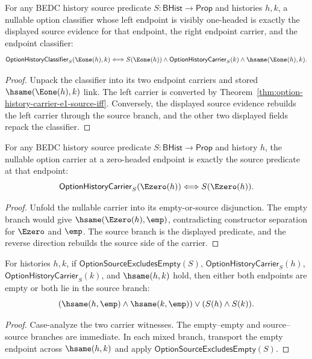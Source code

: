 \begin{theorem}
\label{thm:option-history-classifier-e1-left-source-iff}
For any BEDC history source predicate $S:\mathsf{BHist}\to\mathsf{Prop}$ and
histories $h,k$, a nullable option classifier whose left endpoint is visibly
one-headed is exactly the displayed source evidence for that endpoint, the
right endpoint carrier, and the endpoint classifier:
$$
\mathsf{OptionHistoryClassifier}_S(\Eone(h),k)
\Longleftrightarrow
S(\Eone(h))\land \mathsf{OptionHistoryCarrier}_S(k)\land
\hsame(\Eone(h),k).
$$
\end{theorem}
\begin{proof}
Unpack the classifier into its two endpoint carriers and stored
$\hsame(\Eone(h),k)$ link. The left carrier is converted by
Theorem~\ref{thm:option-history-carrier-e1-source-iff}. Conversely, the
displayed source evidence rebuilds the left carrier through the source branch,
and the other two displayed fields repack the classifier.
\end{proof}

\begin{theorem}
\label{thm:option-history-carrier-e0-source-iff}
For any BEDC history source predicate $S:\mathsf{BHist}\to\mathsf{Prop}$ and
history $h$, the nullable option carrier at a zero-headed endpoint is exactly
the source predicate at that endpoint:
$$
\mathsf{OptionHistoryCarrier}_S(\Ezero(h))
\Longleftrightarrow
S(\Ezero(h)).
$$
\end{theorem}
\begin{proof}
Unfold the nullable carrier into its empty-or-source disjunction. The empty
branch would give $\hsame(\Ezero(h),\emp)$, contradicting constructor
separation for $\Ezero$ and $\emp$. The source branch is the displayed
predicate, and the reverse direction rebuilds the source side of the carrier.
\end{proof}

\begin{theorem}
\label{thm:option-history-carrier-hsame-branch-alignment}
For histories $h,k$, if $\mathsf{OptionSourceExcludesEmpty}(S)$,
$\mathsf{OptionHistoryCarrier}_S(h)$, $\mathsf{OptionHistoryCarrier}_S(k)$, and
$\hsame(h,k)$ hold, then either both endpoints are empty or both lie in the
source branch:
$$
(\hsame(h,\emp)\land\hsame(k,\emp))\lor(S(h)\land S(k)).
$$
\end{theorem}
\begin{proof}
Case-analyze the two carrier witnesses. The empty--empty and source--source
branches are immediate. In each mixed branch, transport the empty endpoint
across $\hsame(h,k)$ and apply $\mathsf{OptionSourceExcludesEmpty}(S)$.
\end{proof}


